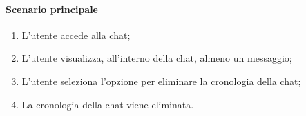 \paragraph*{Scenario principale}
\begin{enumerate}
  \item L'utente accede alla chat;
  \item L'utente visualizza, all'interno della chat, almeno un messaggio;
  \item L'utente seleziona l'opzione per eliminare la cronologia della chat;
  \item La cronologia della chat viene eliminata.
\end{enumerate}
